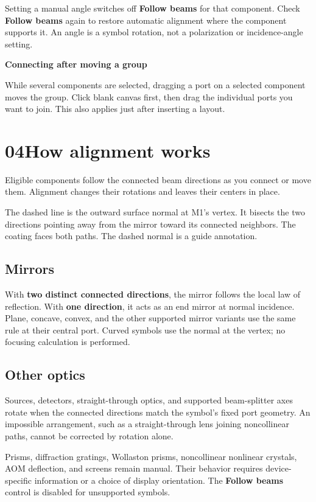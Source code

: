 \documentclass[11pt,a4paper]{article}
\newcommand{\guidepage}[2]{\clearpage\pdfbookmark[0]{#1 - #2}{guide-#1}\section*{\textcolor{accent}{#1}\quad #2}}
\newcommand{\note}[2]{\par\smallskip\noindent\colorbox{pale}{\parbox{\dimexpr\linewidth-18pt\relax}{\vspace{5pt}\textbf{#1}\par\vspace{3pt}#2\vspace{5pt}}}\par\smallskip}
\begin{document}
Setting a manual angle switches off \textbf{Follow beams} for that component. Check \textbf{Follow beams} again to restore automatic alignment where the component supports it. An angle is a symbol rotation, not a polarization or incidence-angle setting.

\note{Connecting after moving a group}{While several components are selected, dragging a port on a selected component moves the group. Click blank canvas first, then drag the individual ports you want to join. This also applies just after inserting a layout.}

\guidepage{04}{How alignment works}
Eligible components follow the connected beam directions as you connect or move them. Alignment changes their rotations and leaves their centers in place.

\begin{center}

\end{center}
{\small\color{muted}The dashed line is the outward surface normal at M1's vertex. It bisects the two directions pointing away from the mirror toward its connected neighbors. The coating faces both paths. The dashed normal is a guide annotation.}

\subsection*{Mirrors}
With \textbf{two distinct connected directions}, the mirror follows the local law of reflection. With \textbf{one direction}, it acts as an end mirror at normal incidence. Plane, concave, convex, and the other supported mirror variants use the same rule at their central port. Curved symbols use the normal at the vertex; no focusing calculation is performed.

\subsection*{Other optics}
Sources, detectors, straight-through optics, and supported beam-splitter axes rotate when the connected directions match the symbol's fixed port geometry. An impossible arrangement, such as a straight-through lens joining noncollinear paths, cannot be corrected by rotation alone.

Prisms, diffraction gratings, Wollaston prisms, noncollinear nonlinear crystals, AOM deflection, and screens remain manual. Their behavior requires device-specific information or a choice of display orientation. The \textbf{Follow beams} control is disabled for unsupported symbols.
\end{document}
